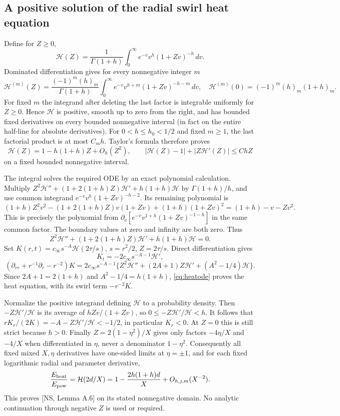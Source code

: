 \documentclass[10pt,a4paper]{article}
\newcommand{\hh}{\mathcal H}
\begin{document}
\subsection{A positive solution of the radial swirl heat equation}
Define for $Z\ge0$,
\[
\hh(Z)=\frac1{\Gamma(1+h)}\int_0^\infty e^{-v}v^h(1+Zv)^{-h}\,dv.
\]
Dominated differentiation gives for every nonnegative integer $m$
\[
\hh^{(m)}(Z)=\frac{(-1)^m(h)_m}{\Gamma(1+h)}
\int_0^\infty e^{-v}v^{h+m}(1+Zv)^{-h-m}\,dv,
\quad \hh^{(m)}(0)=(-1)^m(h)_m(1+h)_m.
\]
For fixed $m$ the integrand after deleting the last factor is integrable
uniformly for $Z\ge0$. Hence $\hh$ is positive, smooth up to zero from the
right, and has bounded fixed derivatives on every bounded nonnegative interval
(in fact on the entire half-line for absolute derivatives).
For $0<h\le h_0<1/2$ and fixed $m\ge1$, the last factorial product is at
most $C_mh$. Taylor's formula therefore proves
\[
\hh(Z)=1-h(1+h)Z+O_h(Z^2),\qquad
|\hh(Z)-1|+|Z\hh'(Z)|\le C hZ
\]
on a fixed bounded nonnegative interval.

The integral solves the required ODE by an exact polynomial calculation.
Multiply
$Z^2\hh''+(1+2(1+h)Z)\hh'+h(1+h)\hh$
by $\Gamma(1+h)/h$, and use common integrand
$e^{-v}v^h(1+Zv)^{-h-2}$. Its remaining polynomial is
\[
(1+h)Z^2v^2-(1+2(1+h)Z)v(1+Zv)+(1+h)(1+Zv)^2
=(1+h)-v-Zv^2.
\]
This is precisely the polynomial from
$\partial_v[e^{-v}v^{1+h}(1+Zv)^{-1-h}]$ in the same common factor.
The boundary values at zero and infinity are both zero. Thus
\begin{equation}\label{eq:heatode}
Z^2\hh''+(1+2(1+h)Z)\hh'+h(1+h)\hh=0.
\end{equation}
Set $K(r,t)=c_\infty s^{-A}\hh(2\tau/s)$, $s=r^2/2$, $Z=2\tau/s$.
Direct differentiation gives
\[
K_t=-2c_\infty s^{-A-1}\hh',
\]
\[
(\partial_{rr}+r^{-1}\partial_r-r^{-2})K
=2c_\infty s^{-A-1}
\{Z^2\hh''+(2A+1)Z\hh'+(A^2-1/4)\hh\}.
\]
Since $2A+1=2(1+h)$ and $A^2-1/4=h(1+h)$,
\eqref{eq:heatode} proves the heat equation, with its swirl term $-r^{-2}K$.

Normalize the positive integrand defining $\hh$ to a probability density.
Then $-Z\hh'/\hh$ is its average of $hZv/(1+Zv)$, so
$0\le-Z\hh'/\hh<h$. It follows that
$rK_r/(2K)=-A-Z\hh'/\hh<-1/2$, in particular $K_r<0$.
At $Z=0$ this is still strict because $h>0$.
Finally $Z=2(1-\eta^2)/X$ gives only factors $-4\eta/X$ and $-4/X$
when differentiated in $\eta$, never a denominator $1-\eta^2$.
Consequently all fixed mixed $X,\eta$ derivatives have one-sided limits at
$\eta=\pm1$, and for each fixed logarithmic radial and parameter derivative,
\[
\frac{E_{\rm heat}}{E_{\rm pow}}
=\hh(2d/X)=1-\frac{2h(1+h)d}{X}+O_{h,j,m}(X^{-2}).
\]
This proves [NS, Lemma A.6] on its stated nonnegative domain. No analytic
continuation through negative $Z$ is used or required.
\end{document}

